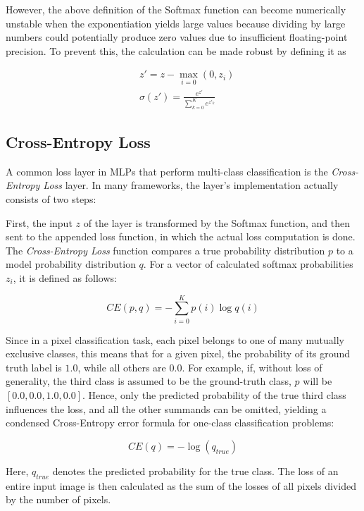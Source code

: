 However, the above definition of the Softmax function can become numerically unstable when the exponentiation yields large values because dividing by large numbers could potentially produce zero values due to insufficient floating-point precision. \cite[p. 81]{deeplearning_book} To prevent this, the calculation can be made robust by defining it as

\begin {align}
	&z' = z - \max \limits_{i = 0}(0, z_i)\\
	&\sigma(z') = \frac{e^{z'}}{\sum_{k=0}^{K} e^{z'_{{k}}}}
\end {align}


		\subsection{Cross-Entropy Loss}
\label{subsec:cross_ent}

A common loss layer in MLPs that perform multi-class classification is the \textit{Cross-Entropy Loss} layer. In many frameworks, the layer's implementation actually consists of two steps:

First, the input $z$ of the layer is transformed by the Softmax function, and then sent to the appended loss function, in which the actual loss computation is done. The \textit{Cross-Entropy Loss} function compares a true probability distribution $p$ to a model probability distribution $q$. For a vector of calculated softmax probabilities $z_i$, it is defined as follows:

\[CE(p, q) = -\sum \limits_{i = 0}^{K} p(i) \log q(i)\]

\noindent Since in a pixel classification task, each pixel belongs to one of many mutually exclusive classes, this means that for a given pixel, the probability of its ground truth label is $1.0$, while all others are $0.0$. For example, if, without loss of generality, the third class is assumed to be the ground-truth class, $p$ will be $[0.0, 0.0, 1.0, 0.0]$.  Hence, only the predicted probability of the true third class influences the loss, and all the other summands can be omitted, yielding a condensed Cross-Entropy error formula for one-class classification problems:

\[ CE(q) = - \log(q_{true}) \]

\noindent Here, $q_{true}$ denotes the predicted probability for the true class. The loss of an entire input image is then calculated as the sum of the losses of all pixels divided by the number of pixels.\\

